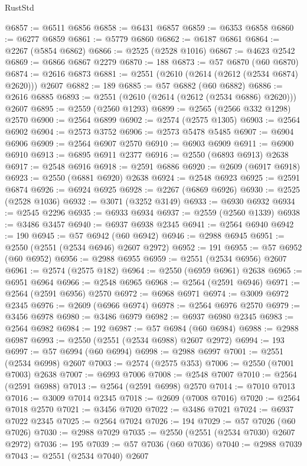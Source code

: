 \begin{lexlean}{RustStd}
\begin{coremodule}
@6857 := @6511 @6856
@6858 := @6431 @6857
@6859 := @6353 @6858
@6860 := @6277 @6859
@6861 := @5779 @6860
@6862 := @6187 @6861
@6864 := @2267 (@5854 @6862)
@6866 := @2525 (@2528 @1016)
@6867 := @4623 @2542
@6869 := @6866 @6867 @2279
@6870 := 188
@6873 := @57 @6870 (@60 @6870)
@6874 := @2616 @6873
@6881 := @2551 (@2610 (@2614 (@2612 (@2534 @6874) @2620))) @2607
@6882 := 189
@6885 := @57 @6882 (@60 @6882)
@6886 := @2616 @6885
@6893 := @2551 (@2610 (@2614 (@2612 (@2534 @6886) @2620))) @2607
@6895 := @2559 (@2560 @1293)
@6899 := @2565 (@2566 @332 @1298) @2570
@6900 := @2564 @6899
@6902 := @2574 (@2575 @1305)
@6903 := @2564 @6902
@6904 := @2573 @3752
@6906 := @2573 @5478 @5485
@6907 := @6904 @6906
@6909 := @2564 @6907 @2570
@6910 := @6903 @6909
@6911 := @6900 @6910
@6913 := @6895 @6911 @2377
@6916 := @2550 (@6893 @6913) @2638
@6917 := @2548 @6916
@6918 := @2591 @6886
@6920 := @2609 (@6917 @6918)
@6923 := @2550 (@6881 @6920) @2638
@6924 := @2548 @6923
@6925 := @2591 @6874
@6926 := @6924 @6925
@6928 := @2267 (@6869 @6926)
@6930 := @2525 (@2528 @1036)
@6932 := @3071 (@3252 @3149)
@6933 := @6930 @6932
@6934 := @2545 @2296
@6935 := @6933 @6934
@6937 := @2559 (@2560 @1339)
@6938 := @3486 @3457
@6940 := @6937 @6938 @2345
@6941 := @2564 @6940
@6942 := 190
@6945 := @57 @6942 (@60 @6942)
@6946 := @2988 @6945
@6951 := @2550 (@2551 (@2534 @6946) @2607 @2972)
@6952 := 191
@6955 := @57 @6952 (@60 @6952)
@6956 := @2988 @6955
@6959 := @2551 (@2534 @6956) @2607
@6961 := @2574 (@2575 @182)
@6964 := @2550 (@6959 @6961) @2638
@6965 := @6951 @6964
@6966 := @2548 @6965
@6968 := @2564 (@2591 @6946)
@6971 := @2564 (@2591 @6956) @2570
@6972 := @6968 @6971
@6974 := @3009 @6972 @2345
@6976 := @2609 (@6966 @6974)
@6978 := @2564 @6976 @2570
@6979 := @3456 @6978
@6980 := @3486 @6979
@6982 := @6937 @6980 @2345
@6983 := @2564 @6982
@6984 := 192
@6987 := @57 @6984 (@60 @6984)
@6988 := @2988 @6987
@6993 := @2550 (@2551 (@2534 @6988) @2607 @2972)
@6994 := 193
@6997 := @57 @6994 (@60 @6994)
@6998 := @2988 @6997
@7001 := @2551 (@2534 @6998) @2607
@7003 := @2574 (@2575 @353)
@7006 := @2550 (@7001 @7003) @2638
@7007 := @6993 @7006
@7008 := @2548 @7007
@7010 := @2564 (@2591 @6988)
@7013 := @2564 (@2591 @6998) @2570
@7014 := @7010 @7013
@7016 := @3009 @7014 @2345
@7018 := @2609 (@7008 @7016)
@7020 := @2564 @7018 @2570
@7021 := @3456 @7020
@7022 := @3486 @7021
@7024 := @6937 @7022 @2345
@7025 := @2564 @7024
@7026 := 194
@7029 := @57 @7026 (@60 @7026)
@7030 := @2988 @7029
@7035 := @2550 (@2551 (@2534 @7030) @2607 @2972)
@7036 := 195
@7039 := @57 @7036 (@60 @7036)
@7040 := @2988 @7039
@7043 := @2551 (@2534 @7040) @2607

\end{coremodule}
\end{lexlean}
